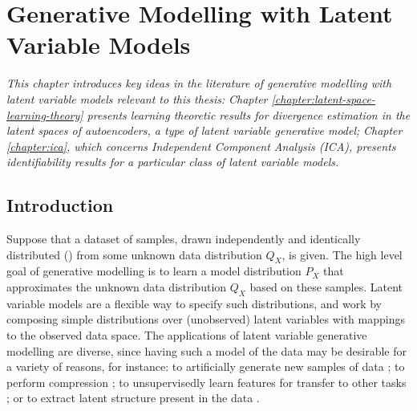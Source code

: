 
\chapter{Generative Modelling with Latent Variable Models}\label{chapter:literature}

\ifpdf
    \graphicspath{{Chapter2/Figs/Raster/}{Chapter2/Figs/PDF/}{Chapter2/Figs/}}
\else
    \graphicspath{{Chapter2/Figs/Vector/}{Chapter2/Figs/}}
\fi

\emph{This chapter introduces key ideas in the literature of generative modelling with latent variable models relevant to this thesis:}
\emph{Chapter \ref{chapter:latent-space-learning-theory} presents learning theoretic results for divergence estimation in the latent spaces of autoencoders, a type of latent variable generative model;}
\emph{Chapter \ref{chapter:ica}, which concerns Independent Component Analysis (ICA), presents identifiability results for a particular class of latent variable models.}


\section{Introduction}\label{sec:generative-modelling-tour}

Suppose that a dataset of samples, drawn independently and identically distributed (\iid) from some unknown data distribution $Q_X$, is given.
The high level goal of generative modelling is to learn a model distribution $P_X$ that approximates the unknown data distribution $Q_X$ based on these samples.
Latent variable models are a flexible way to specify such distributions, and work by composing simple distributions over (unobserved) latent variables with mappings to the observed data space.
The applications of latent variable generative modelling are diverse, since
having such a model of the data may be desirable for a variety of reasons, for instance: to artificially generate new samples of data \citep{goodfellow2014generative, oord2016wavenet}; to perform compression \citep{townsend2019hilloc, townsend2019practical}; to unsupervisedly learn features for transfer to other tasks \citep{tschannen2018recent, donahue2019large}; or to extract latent structure present in the data \citep{hyvarinen2000independent}.

